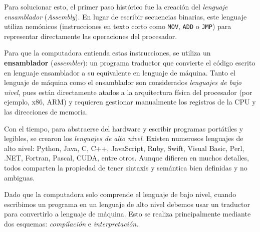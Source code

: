 \documentclass[12pt]{article}
\begin{document}
    Para solucionar esto, el primer paso histórico fue la creación del \textit{lenguaje 
    ensamblador} (\textit{Assembly}). En lugar de escribir secuencias binarias, este lenguaje 
    utiliza nemónicos (instrucciones en texto corto como    \texttt{MOV}, \texttt{ADD} o 
    \texttt{JMP}) para representar directamente las operaciones del procesador. 

    Para que la computadora entienda estas instrucciones, se utiliza un \textbf{ensamblador} 
    (\textit{assembler}): un programa traductor que convierte el código escrito en lenguaje 
    ensamblador a su equivalente en lenguaje de máquina. Tanto el lenguaje de máquina 
    como el ensamblador son considerados \textit{lenguajes de bajo nivel}, pues están 
    directamente atados a la arquitectura física del procesador (por ejemplo, x86, ARM) y 
    requieren gestionar manualmente los registros de la CPU y las direcciones de memoria.

    Con el tiempo, para abstraerse del hardware y escribir programas portátiles y legibles, 
    se crearon los  \textit{lenguajes de alto nivel}. Existen numerosos lenguajes de alto nivel: 
    Python, Java, C, C++, JavaScript, Ruby, Swift, Visual Basic, Perl, .NET, Fortran, Pascal, 
    CUDA, entre otros. Aunque difieren en muchos detalles, 
    todos comparten la propiedad de tener sintaxis y semántica bien definidas y no ambiguas. 

    Dado que la computadora solo comprende el lenguaje de bajo nivel, 
    cuando escribimos un programa en un lenguaje de alto nivel debemos usar un traductor 
    para convertirlo a lenguaje de máquina. 
    Esto se realiza principalmente mediante dos esquemas:
    \textit{compilación} e \textit{interpretación}.
\end{document}
